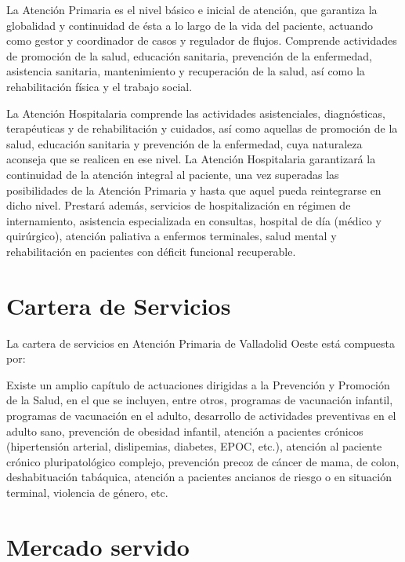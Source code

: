 La Atención Primaria es el nivel básico e inicial de atención, que garantiza la globalidad y continuidad de ésta a lo largo de la vida del paciente, actuando como gestor y coordinador de casos y regulador de flujos. Comprende actividades de promoción de la salud, educación sanitaria, prevención de la enfermedad, asistencia sanitaria, mantenimiento y recuperación de la salud, así como la rehabilitación física y el trabajo social.

La Atención Hospitalaria comprende las actividades asistenciales, diagnósticas, terapéuticas y de rehabilitación y cuidados, así como aquellas de promoción de la salud, educación sanitaria y prevención de la enfermedad, cuya naturaleza aconseja que se realicen en ese nivel. La Atención Hospitalaria garantizará la continuidad de la atención integral al paciente, una vez superadas las posibilidades de la Atención Primaria y hasta que aquel pueda reintegrarse en dicho nivel. Prestará además, servicios de hospitalización en régimen de internamiento, asistencia especializada en consultas, hospital de día (médico y quirúrgico), atención paliativa a enfermos terminales, salud mental y rehabilitación en pacientes con déficit funcional recuperable.

\section{Cartera de Servicios}

La cartera de servicios en Atención Primaria de Valladolid Oeste está compuesta por:


Existe un amplio capítulo de actuaciones dirigidas a la Prevención y Promoción de la Salud, en el que se incluyen, entre otros, programas de vacunación infantil, programas de vacunación en el adulto, desarrollo de actividades preventivas en el adulto sano, prevención de obesidad infantil, atención a pacientes crónicos (hipertensión arterial, dislipemias, diabetes, EPOC, etc.), atención al paciente crónico pluripatológico complejo, prevención precoz de cáncer de mama, de colon, deshabituación tabáquica, atención a pacientes ancianos de riesgo o en situación terminal, violencia de género, etc.

\section{Mercado servido}


